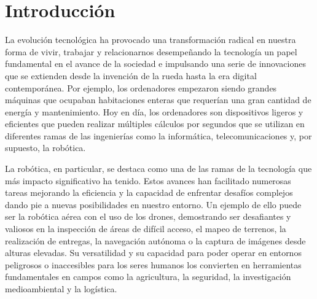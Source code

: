 \chapter{Introducción}
\label{cap:introduccion}
\setcounter{page}{1}

La evolución tecnológica ha provocado una transformación radical en nuestra forma de vivir, trabajar y relacionarnos desempeñando la tecnología un papel 
fundamental en el avance de la sociedad e impulsando una serie de innovaciones que se extienden desde la invención de la rueda hasta la era digital contemporánea. 
Por ejemplo, los ordenadores empezaron siendo grandes máquinas que ocupaban habitaciones enteras que requerían una gran cantidad de energía y mantenimiento. Hoy en día, los ordenadores
son dispositivos ligeros y eficientes que pueden realizar múltiples cálculos por segundos que se utilizan en diferentes ramas de las ingenierías como la informática, telecomunicaciones y,
por supuesto, la robótica. \newline

La robótica, en particular, se destaca como una de las ramas de la tecnología que más impacto significativo ha tenido. Estos avances han facilitado numerosas tareas mejorando la eficiencia 
y la capacidad de enfrentar desafíos complejos dando pie a nuevas posibilidades en nuestro entorno. Un ejemplo de ello puede ser la robótica aérea con el uso de los drones, 
demostrando ser desafiantes y valiosos en la inspección de áreas de difícil acceso, el mapeo de terrenos, la realización de entregas, la navegación autónoma o la captura 
de imágenes desde alturas elevadas. Su versatilidad y su capacidad para poder operar en entornos peligrosos o inaccesibles para los seres humanos los convierten 
en herramientas fundamentales en campos como la agricultura, la seguridad, la investigación medioambiental y la logística. 

